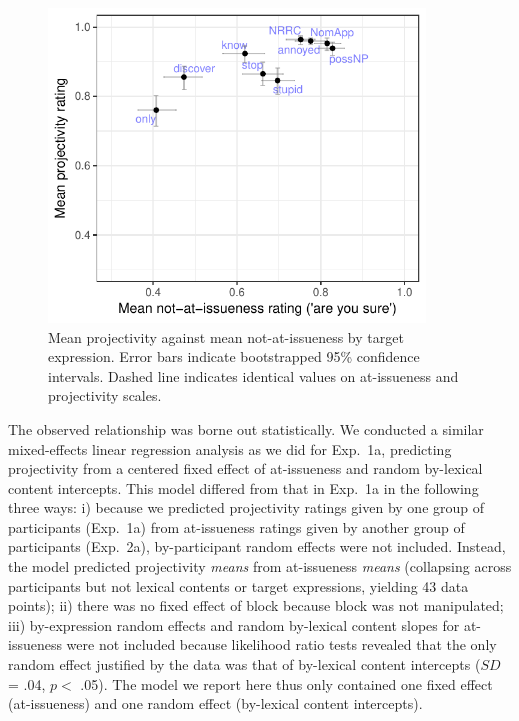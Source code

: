 \documentclass[11pt,fleqn]{article}
\newcommand{\6}{\mbox{$[\hspace*{-.6mm}[$}}
\newcommand{\9}{\mbox{$]\hspace*{-.6mm}]$}}
\begin{document}
\begin{figure}[!h]

\begin{center}
\includegraphics[width=10cm]{../results/exp2a/graphs/ai-proj-bytrigger-labels}
\end{center}

\caption{Mean projectivity against mean not-at-issueness by target expression. Error bars indicate bootstrapped 95\% confidence intervals. Dashed line indicates identical values on at-issueness and projectivity scales.}
\label{fig:f-proj-ai-2a}
\end{figure}


The observed relationship was borne out statistically. We conducted a similar mixed-effects linear regression analysis as we did for Exp.~1a, predicting projectivity from a centered fixed effect of at-issueness and random by-lexical content intercepts. This model differed from that in Exp.~1a in the following three ways: i) because we predicted projectivity ratings given by one group of participants (Exp.~1a) from at-issueness ratings given by another group of participants (Exp.~2a), by-participant random effects were not included. Instead, the model predicted projectivity \emph{means}  from  at-issueness \emph{means} (collapsing across participants but not lexical contents or target expressions, yielding 43 data points); ii) there was no fixed effect of block because block was not manipulated; iii) by-expression random effects and random by-lexical content slopes for at-issueness were not included because likelihood ratio tests revealed that the only random effect justified by the data was that of by-lexical content intercepts ($SD$ = .04, $p < $ .05). The model we report here thus only contained one fixed effect (at-issueness) and one random effect (by-lexical content intercepts).
\end{document}

